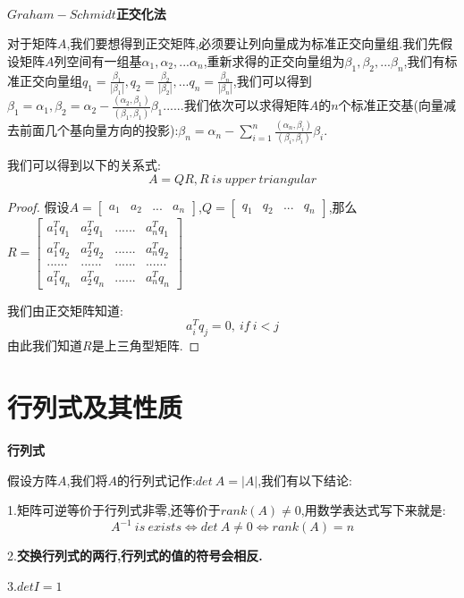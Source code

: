 \documentclass[oneside]{book}
\begin{document}
	\hspace{\fill}\
	
	\textbf{$Graham-Schmidt$正交化法}
	
	对于矩阵$A$,我们要想得到正交矩阵,必须要让列向量成为标准正交向量组.我们先假设矩阵$A$列空间有一组基$\alpha_{1},\alpha_{2},...\alpha_{n}$,重新求得的正交向量组为$\beta_{1},\beta_{2},...\beta_{n}$,我们有标准正交向量组$q_{1}=\frac{\beta_{1}}{|\beta_{1}|},q_{2}=\frac{\beta_{2}}{|\beta_{2}|},...q_{n}=\frac{\beta_{n}}{|\beta_{n}|}$,我们可以得到$\beta_{1}=\alpha_{1},\beta_{2}=\alpha_{2}-\frac{(\alpha_{2},\beta_{1})}{(\beta_{1},\beta_{1})}\beta_{1}$......我们依次可以求得矩阵$A$的$n$个标准正交基(向量减去前面几个基向量方向的投影):$\beta_{n}=\alpha_{n}-\sum_{i=1}^{n}\frac{(\alpha_{n},\beta_{i})}{(\beta_{i},\beta_{i})}\beta_{i}$.
	
	我们可以得到以下的关系式:
	$$A=QR,R\ is\ upper\ triangular $$
	\begin{proof}
		假设$A=\left[\begin{array}{ccccc}
			a_{1}&a_{2}&...&a_{n}
		\end{array}\right]$,$Q=\left[\begin{array}{cccc}
		q_{1}&q_{2}&...&q_{n}\end{array}\right]$,那么$R=\left[\begin{array}{cccc}
			a_{1}^{T}q_{1}&a_{2}^{T}q_{1}&......&a_{n}^{T}q_{1}\\a_{1}^{T}q_{2}&a_{2}^{T}q_{2}&......&a_{n}^{T}q_{2}\\......&......&......&......\\a_{1}^{T}q_{n}&a_{2}^{T}q_{n}&......&a_{n}^{T}q_{n}
		\end{array}\right]$
	
	我们由正交矩阵知道:$$a_{i}^{T}q_{j}=0,\ \textit{if}\ i<j$$
	由此我们知道$R$是上三角型矩阵.
	\end{proof}
	\chapter{行列式及其性质}
	\textbf{行列式}
	
	假设方阵$A$,我们将$A$的行列式记作:$det\ A=|A|$,我们有以下结论:
	
	1.矩阵可逆等价于行列式非零,还等价于$rank(A)\neq 0$,用数学表达式写下来就是:$$A^{-1}\ is\   exists \Leftrightarrow det\ A\neq 0 \Leftrightarrow rank(A)=n$$
	
	2.\textbf{交换行列式的两行,行列式的值的符号会相反.}
	
	3.$det I=1$
	
\end{document}
